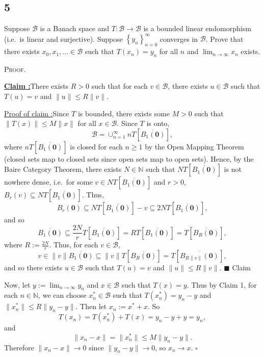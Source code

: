 \documentclass[12pt]{article}
\newcounter{ProofCounter}
\newcounter{ClaimCounter}[ProofCounter]
\newenvironment{Proof}{\stepcounter{ProofCounter}\textsc{Proof.}}{\hfill$\square$}
\newenvironment{claim}[1]{\vspace{1mm}\stepcounter{ClaimCounter}\par\noindent\underline{\bf Claim \theClaimCounter:}\space#1}{}
\newenvironment{claimproof}[1]{\par\noindent\underline{Proof of claim \theClaimCounter:}\space#1}{\hfill $\blacksquare$ Claim \theClaimCounter}
\begin{document}
\subsection*{5}
\begin{tcolorbox}
  Suppose $\mathcal{B}$ is a Banach space and $T : \mathcal{B} \rightarrow \mathcal{B}$ is a bounded linear endomorphism (i.e.\ is linear %
  and surjective). Suppose $\left\{ y_n \right\}_{n=0}^{\infty}$ converges in $\mathcal{B}$. Prove that there exists $x_0, x_1, \hdots \in \mathcal{B}$
  such that $T(x_n) = y_n$ for all $n$ and $\lim_{n\rightarrow\infty}x_n$ exists.
\end{tcolorbox}
\begin{Proof}
  \begin{claim}
    There exists $R > 0$ such that for each $v \in \mathcal{B}$, there exists $u \in \mathcal{B}$ such that $T(u) = v$ and $\|u\| \leq R\|v\|$.
  \end{claim}
  \begin{claimproof}
    Since $T$ is bounded, there exists some $M > 0$ such that $\|T(x)\| \leq M\|x\|$ for all $x \in \mathcal{B}$. Since $T$ is onto, 
    \[ \mathcal{B} = \cup_{n=1}^{\infty}nT[\overline{B_1(\bm{0})}], \]
    where $nT[\overline{B_1(\bm{0})}]$ is closed for each $n \geq 1$ by the Open Mapping Theorem (closed sets map to closed sets since open sets map
    to open sets).
    Hence, by the Baire Category Theorem, there exists $N \in \mathbb{N}$ such that $NT[\overline{B_1(\bm{0})}]$ is not nowhere dense, i.e.\ for some 
    $v\in NT[\overline{B_1(\bm{0})}]$ and $r > 0$, $B_r(v) \subseteq NT[\overline{B_1(\bm{0})}]$. Thus,
    \[ B_r(\bm{0}) \subseteq NT[\overline{B_1(\bm{0})}] - v \subseteq 2NT[\overline{B_1(\bm{0})}], \]
    and so
    \[ \overline{B_1(\bm{0})} \subseteq \frac{2N}{r}T[\overline{B_1(\bm{0})}] = RT[\overline{B_{1}(\bm{0})}] = T[\overline{B_{R}(\bm{0})}], \]
    where $R := \frac{2N}{r}$. Thus, for each $v \in \mathcal{B}$, 
    \[ v \in \|v\|\overline{B_1(\bm{0})} \subseteq \|v\|T[\overline{B_{R}(\bm{0})}] = T[\overline{B_{R\|v\|}(\bm{0})}], \]
    and so there exists $u \in \mathcal{B}$ such that $T(u) = v$ and $\|u\| \leq R\|v\|$.
  \end{claimproof}

  \vspace{5mm}
  Now, let $y := \lim_{n\rightarrow\infty}y_{n}$ and $x \in \mathcal{B}$ such that $T(x) = y$. 
  Thus by Claim 1, for each $n \in \mathbb{N}$, we can choose $x_{n}^{*} \in \mathcal{B}$ such that 
  $T(x_{n}^{*}) = y_n - y$ and $\|x_{n}^{*}\| \leq R\|y_n - y\|$. Then let $x_n := x^{*} + x$. So
  \[ T(x_n) = T(x_{n}^{*}) + T(x) = y_n - y + y = y_n, \]
  and 
  \[ \|x_n - x\| = \|x_{n}^{*}\| \leq M\|y_n - y\|. \]
  Therefore $\|x_n - x\| \rightarrow 0$ since $\|y_n - y\| \rightarrow 0$, so $x_n \rightarrow x$.
\end{Proof}
\end{document}
